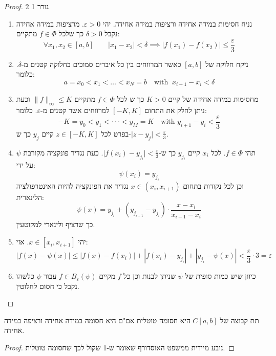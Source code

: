 \documentclass{tstextbook}
\begin{document}
\begin{proof}
2 גורר 1

  \begin{enumerate}
    \item נניח חסימות במידה אחידה ורציפות במידה אחידה. יהי \(\varepsilon> 0\). מרציפות במידה אחידה נקבל \(\delta>0\) כך שלכל \(f \in \Phi\) מתקיים: 
$$\forall x_{1},x_{2}\in[a,b]\qquad \lvert x_{1}-x_{2} \rvert <\delta\implies \lvert f(x_{1})-f(x_{2}) \rvert \leq  \frac{\varepsilon}{3} $$


    \item ניקח חלוקה של \([a,b]\) כאשר המרווחים בין כל איברים סמוכים בחלוקה קטנים מ-\(\delta\). כלומר: 
$$a = x_0 < x_1 < \dots < x_N = b \quad \text{with}\;\;x_{i+1} - x_i < \delta$$


    \item מחסימות במידה אחידה של קיים \(K>0\) כך ש-לכל \(f \in \Phi\) מתקיים \(\lVert f \rVert_{\infty}\leq K\) וכעת ניתן לחלק את התחום \([-K,K]\) למרווחים אשר קטנים מ-\(\varepsilon\). כלומר: 
$$-K=y_{0}<y_{1}<\cdot\cdot\cdot<y_{M}=K\quad \text{with }y_{i+1}-y_{i}<\frac{\varepsilon}{3}$$
בפרט לכל \(z \in [-K,K]\) קיים \(y_{j}\) כך ש-\(\lvert z-y_{j} \rvert<\frac{\varepsilon}{3}\).


    \item תהי \(f \in \Phi\). לכל \(x_{i}\) קיים \(y_{j_{i}}\) כך ש-\(\lvert f(x_{i})-y_{j_{i}} \rvert<\frac{\varepsilon}{3}\). כעת נגדיר פונקציה מקורבת \(\psi\) על ידי: 
$$\psi(x_{i})=y_{j_{i}}$$
וכן לכל נקודות בתחום \(x \in (x_{i},x_{i+1})\) נגדיר את הפונקציה להיות האינטרפולציה הלינארית:
$$\psi(x)=y_{j_{i}}+(y_{j_{i+1}}-y_{j_{i}})\cdot{\frac{x-x_{i}}{x_{i+1}-x_{i}}}$$
כך שרציף ולינארי למקוטעין.


    \item יהי \(x \in [x_{i},x_{i+1}]\). אזי: 
$$|f(x)-\psi(x)|\leq|f(x)-f(x_{i})|+|f(x_{i})-y_{j_{i}}|+|y_{j_{i}}-\psi(x)|<\frac{\varepsilon}{3}\cdot 3 = \varepsilon$$


    \item כיוון שיש כמות סופית של \(\psi\) שניתן לבנות וכן כל \(f\) מקיים \(f \in B_{\varepsilon}(\psi)\) עבור \(\psi\) כלשהו נקבל כי חסום לחלוטין. 


  \end{enumerate}
\end{proof}
\begin{corollary}
תת קבוצה של \(C[a,b]\) היא חסומה טוטלית אם"ם היא חסומה במידה אחידה ורציפה במידה אחידה.

\end{corollary}
\begin{proof}
נובע מיידית ממשפט האוסדורף שאומר ש-1 שקול לכך שחסומה טוטלית.

\end{proof}
\end{document}

